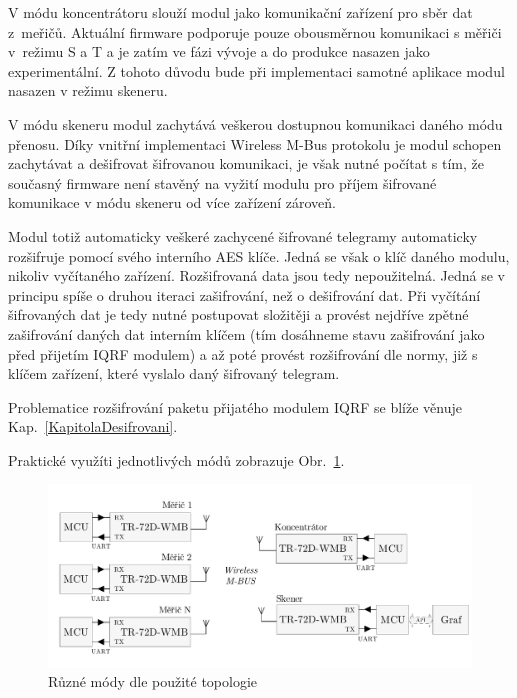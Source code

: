 V módu koncentrátoru slouží modul jako komunikační zařízení pro sběr dat z~meřičů. Aktuální firmware podporuje pouze obousměrnou komunikaci s měřiči v~režimu S a T a je zatím ve fázi vývoje a do produkce nasazen jako experimentální. Z tohoto důvodu bude při implementaci samotné aplikace modul nasazen v režimu skeneru.

V módu skeneru modul zachytává veškerou dostupnou komunikaci daného módu přenosu. Díky vnitřní implementaci Wireless M-Bus protokolu je modul schopen zachytávat a dešifrovat šifrovanou komunikaci, je však nutné počítat s tím, že současný firmware není stavěný na vyžití modulu pro příjem šifrované komunikace v módu skeneru od více zařízení zároveň. 

Modul totiž automaticky veškeré zachycené šifrované telegramy automaticky rozšifruje pomocí svého interního AES klíče. Jedná se však o klíč daného modulu, nikoliv vyčítaného zařízení. Rozšifrovaná data jsou tedy nepoužitelná. Jedná se v principu spíše o druhou iteraci zašifrování, než o dešifrování dat. Při vyčítání šifrovaných dat je tedy nutné postupovat složitěji a provést nejdříve zpětné zašifrování daných dat interním klíčem (tím dosáhneme stavu zašifrování jako před přijetím IQRF modulem) a až poté provést rozšifrování dle normy, již s klíčem zařízení, které vyslalo daný šifrovaný telegram. 

Problematice rozšifrování paketu přijatého modulem IQRF se blíže věnuje Kap.~\ref{KapitolaDesifrovani}.

Praktické využíti jednotlivých módů zobrazuje Obr.~\ref{TopologieIQRF}.

 \begin{figure}[!ht]
\vspace{-20pt}
  \begin{center}
    \includegraphics[scale=0.65]{obrazky/modul_topologie}
  \end{center}
	\vspace{-30pt}
  \caption{Různé módy dle použité topologie \cite{ModulIQRF}}
	\label{TopologieIQRF}
	\vspace{-20pt}
\end{figure}

